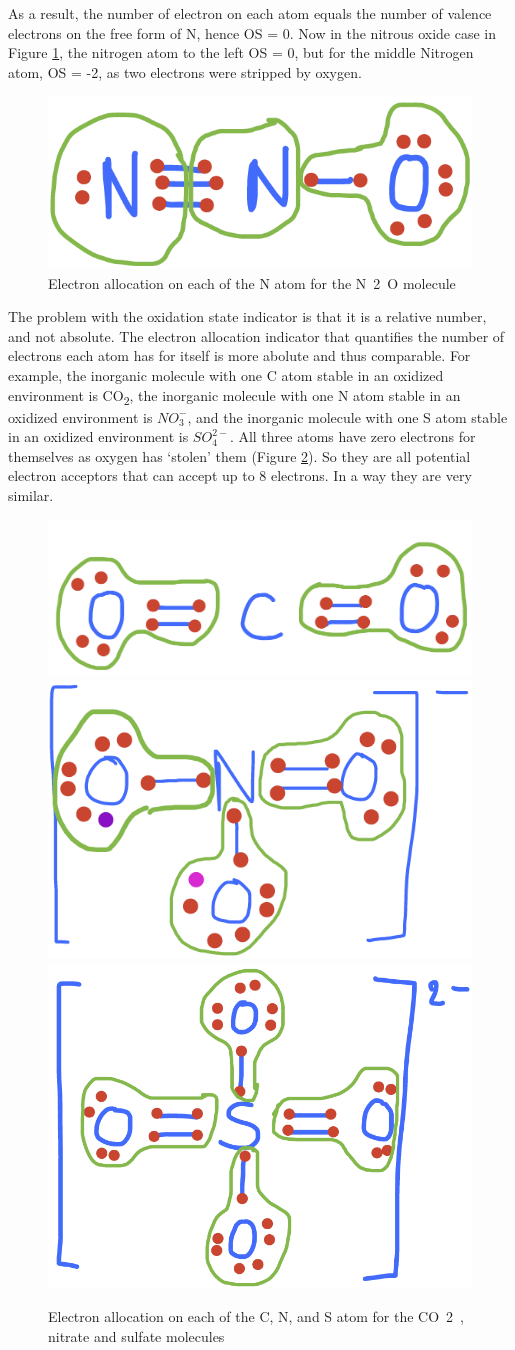 \documentclass[]{book}
\theoremstyle{definition}
\theoremstyle{definition}
\theoremstyle{definition}
\theoremstyle{remark}
\begin{document}
As a result, the number of electron on each atom equals the number of
valence electrons on the free form of N, hence OS = 0. Now in the
nitrous oxide case in Figure \ref{fig:ElecAlloc-N2O}, the nitrogen atom
to the left OS = 0, but for the middle Nitrogen atom, OS = -2, as two
electrons were stripped by oxygen.

\begin{figure}

{\centering \includegraphics[width=0.2\linewidth]{pictures/ElecAlloc_N2O} 

}

\caption{Electron allocation on each of the N atom for the N~2~O molecule}\label{fig:ElecAlloc-N2O}
\end{figure}

The problem with the oxidation state indicator is that it is a relative
number, and not absolute. The electron allocation indicator that
quantifies the number of electrons each atom has for itself is more
abolute and thus comparable. For example, the inorganic molecule with
one C atom stable in an oxidized environment is CO\textsubscript{2}, the
inorganic molecule with one N atom stable in an oxidized environment is
\(NO_3^-\), and the inorganic molecule with one S atom stable in an
oxidized environment is \(SO_4^{2-}\). All three atoms have zero
electrons for themselves as oxygen has `stolen' them (Figure
\ref{fig:ElecAlloc-CO2-NO3-SO4}). So they are all potential electron
acceptors that can accept up to 8 electrons. In a way they are very
similar.

\begin{figure}

{\centering \includegraphics[width=0.2\linewidth]{pictures/ElecAlloc_CO2} \includegraphics[width=0.2\linewidth]{pictures/ElecAlloc_NO3-} \includegraphics[width=0.2\linewidth]{pictures/ElecAlloc_SO42-} 

}

\caption{Electron allocation on each of the C, N, and S atom for the CO~2~, nitrate and sulfate molecules}\label{fig:ElecAlloc-CO2-NO3-SO4}
\end{figure}
\end{document}
